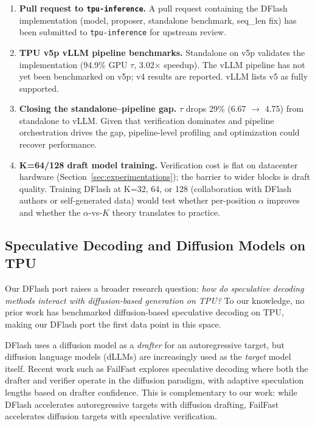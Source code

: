 \documentclass[12pt,letterpaper]{article}
\begin{document}
\begin{enumerate}
    \item \textbf{Pull request to \texttt{tpu-inference}.} A pull request containing the DFlash implementation (model, proposer, standalone benchmark, seq\_len fix) has been submitted to \texttt{tpu-inference} for upstream review.
    \item \textbf{TPU v5p vLLM pipeline benchmarks.} Standalone on v5p validates the implementation (94.9\% GPU $\tau$, 3.02$\times$ speedup). The vLLM pipeline has not yet been benchmarked on v5p; v4 results are reported. vLLM lists v5 as fully supported.
    \item \textbf{Closing the standalone--pipeline gap.} $\tau$ drops 29\% (6.67 $\to$ 4.75) from standalone to vLLM. Given that verification dominates and pipeline orchestration drives the gap, pipeline-level profiling and optimization could recover performance.
    \item \textbf{K=64/128 draft model training.} Verification cost is flat on datacenter hardware (Section~\ref{sec:experimentations}); the barrier to wider blocks is draft quality. Training DFlash at K=32, 64, or 128 (collaboration with DFlash authors or self-generated data) would test whether per-position $\alpha$ improves and whether the $\alpha$-vs-$K$ theory translates to practice.
\end{enumerate}

\subsection{Speculative Decoding and Diffusion Models on TPU}

Our DFlash port raises a broader research question: \textit{how do speculative decoding methods interact with diffusion-based generation on TPU?} To our knowledge, no prior work has benchmarked diffusion-based speculative decoding on TPU, making our DFlash port the first data point in this space.

DFlash uses a diffusion model as a \emph{drafter} for an autoregressive target, but diffusion language models (dLLMs) are increasingly used as the \emph{target} model itself. Recent work such as FailFast \citep{pan2026failfastwinbig} explores speculative decoding where both the drafter and verifier operate in the diffusion paradigm, with adaptive speculation lengths based on drafter confidence. This is complementary to our work: while DFlash accelerates autoregressive targets with diffusion drafting, FailFast accelerates diffusion targets with speculative verification.
\end{document}
